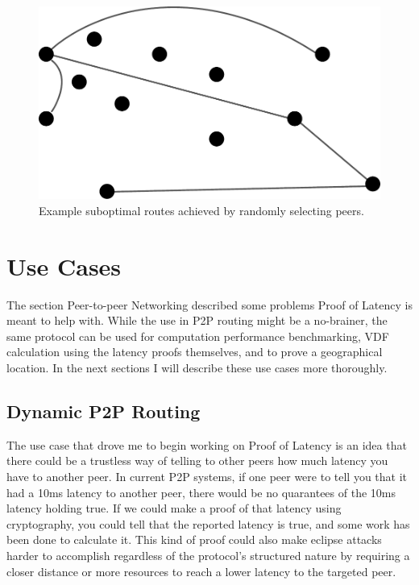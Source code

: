 \begin{figure}
	\includegraphics[width=\textwidth]{pictures/random_routing.pdf}
	\caption{Example suboptimal routes achieved by randomly selecting peers.}
	\label{Subobtimal Topology}
\end{figure}

\section{Use Cases}
The section Peer-to-peer Networking described some problems Proof of Latency is meant to help with. While the use in P2P routing might be a no-brainer, the same protocol can be used for computation performance benchmarking, VDF calculation using the latency proofs themselves, and to prove a geographical location. In the next sections I will describe these use cases more thoroughly.

\subsection{Dynamic P2P Routing}
The use case that drove me to begin working on Proof of Latency is an idea that there could be a trustless way of telling to other peers how much latency you have to another peer. In current P2P systems, if one peer were to tell you that it had a 10ms latency to another peer, there would be no quarantees of the 10ms latency holding true. If we could make a proof of that latency using cryptography, you could tell that the reported latency is true, and some work has been done to calculate it. This kind of proof could also make eclipse attacks harder to accomplish regardless of the protocol's structured nature by requiring a closer distance or more resources to reach a lower latency to the targeted peer.


